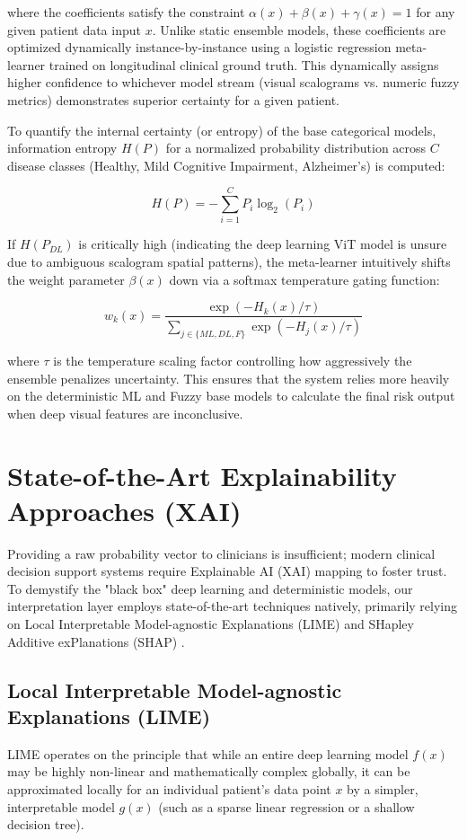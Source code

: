 \documentclass[openany]{book}
\begin{document}
where the coefficients satisfy the constraint $\alpha(x) + \beta(x) + \gamma(x) = 1$ for any given patient data input $x$. Unlike static ensemble models, these coefficients are optimized dynamically instance-by-instance using a logistic regression meta-learner trained on longitudinal clinical ground truth. This dynamically assigns higher confidence to whichever model stream (visual scalograms vs. numeric fuzzy metrics) demonstrates superior certainty for a given patient. 

To quantify the internal certainty (or entropy) of the base categorical models, information entropy $H(P)$ for a normalized probability distribution across $C$ disease classes (Healthy, Mild Cognitive Impairment, Alzheimer's) is computed:

\begin{equation}
    H(P) = -\sum_{i=1}^{C} P_i \log_2(P_i)
\end{equation}

If $H(P_{DL})$ is critically high (indicating the deep learning ViT model is unsure due to ambiguous scalogram spatial patterns), the meta-learner intuitively shifts the weight parameter $\beta(x)$ down via a softmax temperature gating function:

\begin{equation}
    w_k(x) = \frac{\exp(-H_k(x) / \tau)}{\sum_{j \in \{ML, DL, F\}} \exp(-H_j(x) / \tau)}
\end{equation}

where $\tau$ is the temperature scaling factor controlling how aggressively the ensemble penalizes uncertainty. This ensures that the system relies more heavily on the deterministic ML and Fuzzy base models to calculate the final risk output when deep visual features are inconclusive.

\section{State-of-the-Art Explainability Approaches (XAI)}
\label{sec:xai}
Providing a raw probability vector to clinicians is insufficient; modern clinical decision support systems require Explainable AI (XAI) mapping to foster trust. To demystify the "black box" deep learning and deterministic models, our interpretation layer employs state-of-the-art techniques natively, primarily relying on Local Interpretable Model-agnostic Explanations (LIME) \cite{ribeiro2016lime} and SHapley Additive exPlanations (SHAP) \cite{lundberg2017shap}.

\subsection{Local Interpretable Model-agnostic Explanations (LIME)}
\label{subsec:lime}
LIME operates on the principle that while an entire deep learning model $f(x)$ may be highly non-linear and mathematically complex globally, it can be approximated locally for an individual patient's data point $x$ by a simpler, interpretable model $g(x)$ (such as a sparse linear regression or a shallow decision tree).
\end{document}
